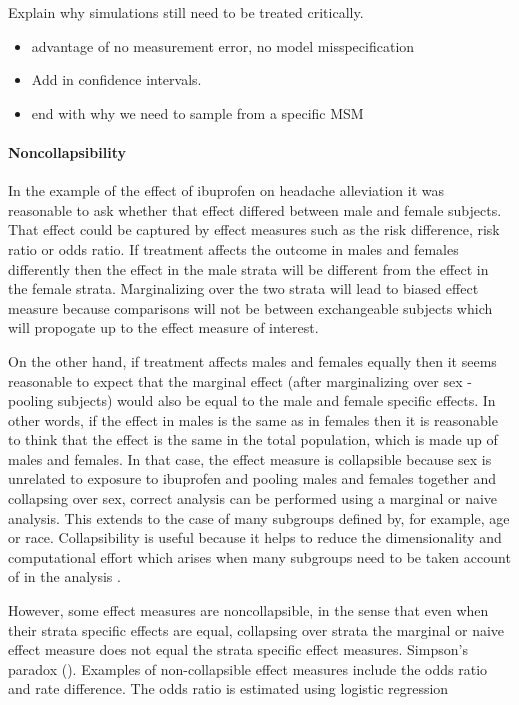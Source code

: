 \documentclass[11pt]{article}
\providecommand{\tightlist}{%
      \setlength{\itemsep}{0pt}\setlength{\parskip}{0pt}}
\begin{document}
Explain why simulations still need to be treated critically.
\citet{Greenland1997}

\begin{itemize}
\tightlist
\item
  advantage of no measurement error, no model misspecification
\item
  Add in confidence intervals.
\item
  end with why we need to sample from a specific MSM
\end{itemize}

    \paragraph{Noncollapsibility}\label{noncollapsibility}

In the example of the effect of ibuprofen on headache alleviation it was
reasonable to ask whether that effect differed between male and female
subjects. That effect could be captured by effect measures such as the
risk difference, risk ratio or odds ratio. If treatment affects the
outcome in males and females differently then the effect in the male
strata will be different from the effect in the female strata.
Marginalizing over the two strata will lead to biased effect measure
because comparisons will not be between exchangeable subjects which will
propogate up to the effect measure of interest. \linebreak

On the other hand, if treatment affects males and females equally then
it seems reasonable to expect that the marginal effect (after
marginalizing over sex - pooling subjects) would also be equal to the
male and female specific effects. In other words, if the effect in males
is the same as in females then it is reasonable to think that the effect
is the same in the total population, which is made up of males and
females. In that case, the effect measure is collapsible because sex is
unrelated to exposure to ibuprofen and pooling males and females
together and collapsing over sex, correct analysis can be performed
using a marginal or naive analysis. This extends to the case of many
subgroups defined by, for example, age or race. Collapsibility is useful
because it helps to reduce the dimensionality and computational effort
which arises when many subgroups need to be taken account of in the
analysis \citet{Didelez2010}. \linebreak

However, some effect measures are noncollapsible, in the sense that even
when their strata specific effects are equal, collapsing over strata the
marginal or naive effect measure does not equal the strata specific
effect measures. Simpson's paradox (\citet{}). Examples of
non-collapsible effect measures include the odds ratio and rate
difference. The odds ratio is estimated using logistic regression
\end{document}
